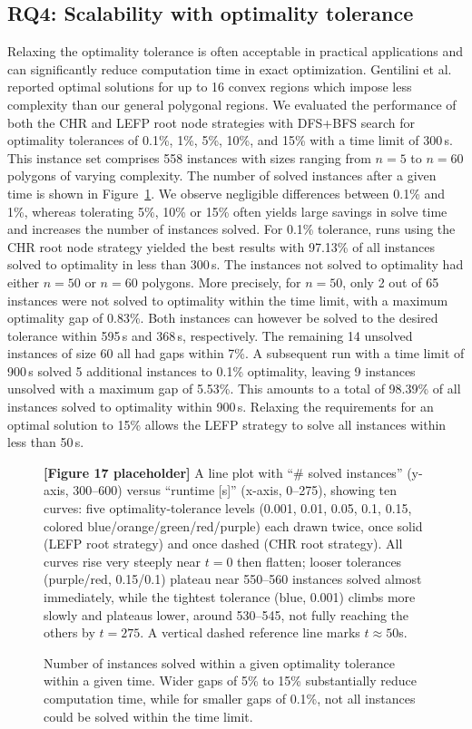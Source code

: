 \documentclass[11pt,a4paper]{article}
\theoremstyle{plain}
\begin{document}
\subsection{RQ4: Scalability with optimality tolerance}
\label{sec:4.6}

Relaxing the optimality tolerance is often acceptable in practical applications and can significantly reduce computation time in exact optimization. Gentilini et al.~\cite{ref29} reported optimal solutions for up to 16 convex regions which impose less complexity than our general polygonal regions. We evaluated the performance of both the CHR and LEFP root node strategies with DFS+BFS search for optimality tolerances of 0.1\%, 1\%, 5\%, 10\%, and 15\% with a time limit of 300\,s. This instance set comprises 558 instances with sizes ranging from $n = 5$ to $n = 60$ polygons of varying complexity. The number of solved instances after a given time is shown in Figure~\ref{fig:17}. We observe negligible differences between 0.1\% and 1\%, whereas tolerating 5\%, 10\% or 15\% often yields large savings in solve time and increases the number of instances solved. For 0.1\% tolerance, runs using the CHR root node strategy yielded the best results with 97.13\% of all instances solved to optimality in less than 300\,s. The instances not solved to optimality had either $n = 50$ or $n = 60$ polygons. More precisely, for $n = 50$, only 2 out of 65 instances were not solved to optimality within the time limit, with a maximum optimality gap of 0.83\%. Both instances can however be solved to the desired tolerance within 595\,s and 368\,s, respectively. The remaining 14 unsolved instances of size 60 all had gaps within 7\%. A subsequent run with a time limit of 900\,s solved 5 additional instances to 0.1\% optimality, leaving 9 instances unsolved with a maximum gap of 5.53\%. This amounts to a total of 98.39\% of all instances solved to optimality within 900\,s. Relaxing the requirements for an optimal solution to 15\% allows the LEFP strategy to solve all instances within less than 50\,s.

\begin{figure}[h]
\centering
\begin{figplaceholder}
\textbf{[Figure 17 placeholder]} A line plot with ``\# solved instances'' (y-axis, 300--600) versus ``runtime [s]'' (x-axis, 0--275), showing ten curves: five optimality-tolerance levels (0.001, 0.01, 0.05, 0.1, 0.15, colored blue/orange/green/red/purple) each drawn twice, once solid (LEFP root strategy) and once dashed (CHR root strategy). All curves rise very steeply near $t=0$ then flatten; looser tolerances (purple/red, 0.15/0.1) plateau near 550--560 instances solved almost immediately, while the tightest tolerance (blue, 0.001) climbs more slowly and plateaus lower, around 530--545, not fully reaching the others by $t=275$. A vertical dashed reference line marks $t \approx 50$s.
\end{figplaceholder}
\caption{Number of instances solved within a given optimality tolerance within a given time. Wider gaps of 5\% to 15\% substantially reduce computation time, while for smaller gaps of 0.1\%, not all instances could be solved within the time limit.}
\label{fig:17}
\end{figure}
\end{document}

